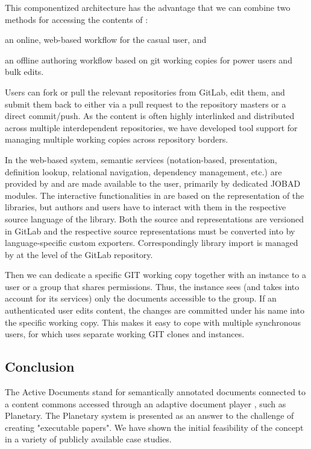 This componentized architecture has the advantage that we can combine two methods for
accessing the contents of \mathhub:
\begin{inparaenum}[\em i\rm)]
\item an online, web-based workflow for the casual user, and
\item an offline authoring workflow based on git working copies for power users and bulk
  edits.
\end{inparaenum}
Users can fork or pull the relevant repositories from GitLab, edit them, and submit them back to \mathhub
either via a pull request to the repository masters or a direct commit/push.
As the content is often highly interlinked and distributed across multiple interdependent repositories, we
have developed tool support for managing multiple working copies across repository borders.

In the web-based system, semantic services (notation-based, presentation, definition
lookup, relational navigation, dependency management, etc.) are provided by \mmt and are
made available to the user, primarily by dedicated JOBAD~\cite{GLR:WebSvcActMathDoc09}
modules.
The interactive functionalities in \mathhub are based on the \ommt representation of
the libraries, but authors and users have to interact with them in the respective source
language of the library.  Both the source and \ommt representations are versioned in
GitLab and the respective source representations must be converted into \ommt by
language-specific custom exporters. Correspondingly library import is managed by \mathhub
at the level of the GitLab repository.

Then we can dedicate a specific GIT working copy together with an \mmt instance to a user
or a group that shares permissions.  Thus, the \mmt instance sees (and takes into account
for its services) only the documents accessible to the group.  If an authenticated user
edits \mathhub content, the changes are committed under his name into the specific working
copy.  This makes it easy to cope with multiple synchronous users, for which \mathhub uses
separate working GIT clones and \mmt instances.


\subsection{Conclusion}

The Active Documents stand for semantically annotated documents connected to a content
commons accessed through an adaptive document player , such as Planetary. The Planetary
system is presented as an answer to the challenge of creating "executable papers". We have
shown the initial feasibility of the concept in a variety of publicly available case
studies.

